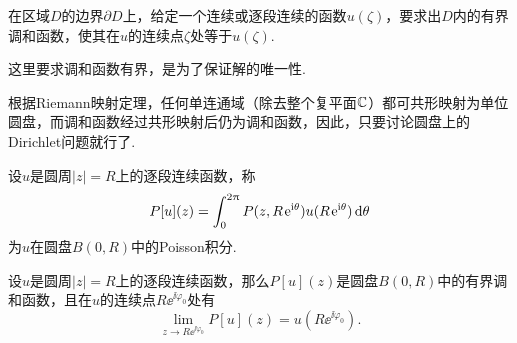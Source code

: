 在区域$D$的边界$\partial D$上，给定一个连续或逐段连续的函数$u(\zeta)$，要求出$D$内的有界调和函数，使其在$u$的连续点$\zeta$处等于$u(\zeta)$.

这里要求调和函数有界，是为了保证解的唯一性.

根据Riemann映射定理，任何单连通域（除去整个复平面$\mathbb C$）都可共形映射为单位圆盘，而调和函数经过共形映射后仍为调和函数，因此，只要讨论圆盘上的Dirichlet问题就行了.

设$u$是圆周$|z|=R$上的逐段连续函数，称
\begin{equation}\label{eq8.2.1}
P[u](z)=\int_0^{2\uppi}P(z,R\operatorname{\!\!\;\mathrm e}^{\mathrm i\theta})u(R\operatorname{\!\!\;\mathrm e}^{\mathrm i\theta})\mathop{}\!\mathrm{d} \theta
\end{equation}
为$u$在圆盘$B(0,R)$中的Poisson积分.
\begin{theorem}\label{thm8.2.1}
设$u$是圆周$|z|=R$上的逐段连续函数，那么$P[u](z)$是圆盘$B(0,R)$中的有界调和函数，且在$u$的连续点$R\ee^{\ii\varphi_0}$处有
\begin{equation}\label{eq8.2.2}
\lim_{z\to R\ee^{\ii\varphi_0}}P[u](z)=u(R\ee^{\ii\varphi_0}).
\end{equation}
\end{theorem}
